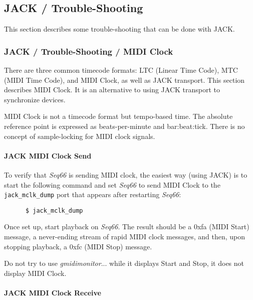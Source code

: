 \subsection{JACK / Trouble-Shooting}
\label{subsec:jack_testing}

   This section describes some trouble-shooting that can be done with JACK.

\subsubsection{JACK / Trouble-Shooting / MIDI Clock}
\label{subsubsec:jack_testing_midi_clock}

   There are three common timecode formats: LTC (Linear Time Code),
   MTC (MIDI Time Code), and MIDI Clock, as well
   as JACK transport.
   This section describes MIDI Clock.
   It is an alternative to using JACK transport to synchronize devices.

   MIDI Clock is not a timecode format but tempo-based time. The absolute
   reference point is expressed as beats-per-minute and bar:beat:tick.
   There is no concept of sample-locking for MIDI clock signals.

\paragraph{JACK MIDI Clock Send}
\label{paragraph:jack_testing_midi_clock_send}

   To verify that \textsl{Seq66} is sending MIDI clock, the easiest way (using
   JACK) is to start the following command and set \textsl{Seq66} to send
   MIDI Clock to the \texttt{jack\_mclk\_dump} port
   that appears after restarting
   \textsl{Seq66}:

   \begin{verbatim}
      $ jack_mclk_dump
   \end{verbatim}

   Once set up, start playback on \textsl{Seq66}.
   The result should be a 0xfa (MIDI Start) message,
   a never-ending stream of rapid MIDI clock messages,
   and then, upon stopping playback, a 0xfc (MIDI Stop) message.

   Do not try to use \textsl{gmidimonitor}... while it displays Start and Stop,
   it does not display MIDI Clock.

\paragraph{JACK MIDI Clock Receive}
\label{paragraph:jack_testing_midi_clock_receive}


